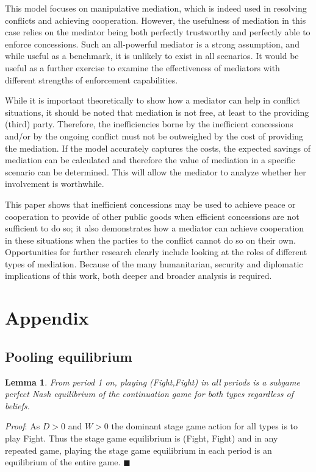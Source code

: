 \documentclass[12pt, letterpaper]{article}
\newtheorem{lemma}{Lemma}
\begin{document}
This model focuses on manipulative mediation, which is indeed used in resolving conflicts and achieving cooperation. However, the usefulness of mediation in this case relies on the mediator being both perfectly trustworthy and perfectly able to enforce concessions. Such an all-powerful mediator is a strong assumption, and while useful as a benchmark, it is unlikely to exist in all scenarios. It would be useful as a further exercise to examine the effectiveness of mediators with different strengths of enforcement capabilities. 

While it is important theoretically to show how a mediator can help in conflict situations, it should be noted that mediation is not free, at least to the providing (third) party. Therefore, the inefficiencies borne by the inefficient concessions and/or by the ongoing conflict must not be outweighed by the cost of providing the mediation. If the model accurately captures the costs, the expected savings of mediation can be calculated and therefore the value of mediation in a specific scenario can be determined. This will allow the mediator to analyze whether her involvement is worthwhile. 

This paper shows that inefficient concessions may be used to achieve peace or cooperation to provide of other public goods when efficient concessions are not sufficient to do so; it also demonstrates how a mediator can achieve cooperation in these situations when the parties to the conflict cannot do so on their own. Opportunities for further research clearly include looking at the roles of different types of mediation. Because of the many humanitarian, security and diplomatic implications of this work, both deeper and broader analysis is required.

\section{Appendix}


\subsection{Pooling equilibrium}
\begin{lemma}
	From period 1 on, playing (Fight,Fight) in all periods is a subgame perfect Nash equilibrium of the continuation game for both types regardless of beliefs.
	\label{lemma:1}
\end{lemma}
\emph{Proof}: As $D>0$ and $W>0$ the dominant stage game action for all types is to play Fight. Thus the stage game equilibrium is (Fight, Fight) and in any repeated game, playing the stage game equilibrium in each period is an equilibrium of the entire game. \hfill $\blacksquare$\\
\end{document}

